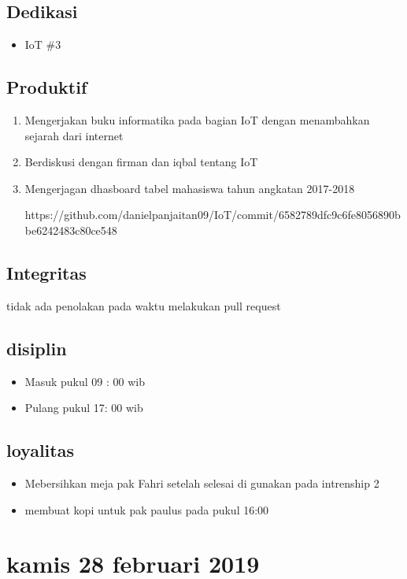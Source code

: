 \subsection{Dedikasi}
\begin{itemize}
  \item IoT \#3
  \end{itemize}
\subsection{Produktif}

\begin{enumerate}
  \item Mengerjakan buku informatika pada bagian IoT dengan menambahkan sejarah dari internet
  \item Berdiskusi dengan firman dan iqbal tentang IoT
  \item Mengerjagan dhasboard tabel mahasiswa tahun angkatan 2017-2018

  \subitem https://github.com/danielpanjaitan09/IoT/commit/6582789dfc9c6fe8056890bbe6242483c80ce548
\end{enumerate}


\subsection{Integritas}
tidak ada penolakan pada waktu melakukan pull request
\subsection{disiplin}
\begin{itemize}
  \item Masuk pukul 09 : 00 wib
  \item Pulang pukul 17: 00 wib
\end{itemize}
\subsection{loyalitas}
\begin{itemize}
  \item Mebersihkan meja pak Fahri setelah selesai di gunakan pada intrenship 2
  \item membuat kopi untuk pak paulus pada pukul 16:00
\end{itemize}


\section{kamis 28 februari 2019}
